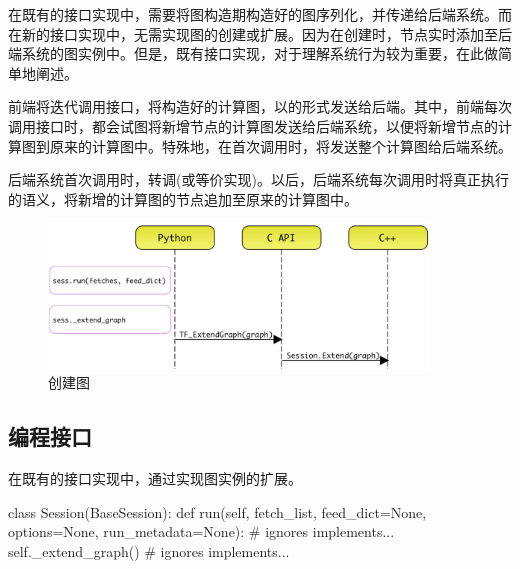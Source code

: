 \begin{content}

在既有的接口实现中，需要将图构造期构造好的图序列化，并传递给后端系统。而在新的接口实现中，无需实现图的创建或扩展。因为在创建时，节点实时添加至后端系统的图实例中。但是，既有接口实现，对于理解系统行为较为重要，在此做简单地阐述。

前端将迭代调用接口，将构造好的计算图，以的形式发送给\cpp{}后端。其中，前端每次调用接口时，都会试图将新增节点的计算图发送给后端系统，以便将新增节点的计算图到原来的计算图中。特殊地，在首次调用时，将发送整个计算图给后端系统。

后端系统首次调用时，转调(或等价实现)。以后，后端系统每次调用时将真正执行的语义，将新增的计算图的节点追加至原来的计算图中。

\begin{figure}[H]
\centering
\includegraphics[width=0.9\textwidth]{figures/py-session-create-graph.png}
\caption{创建图}
 \label{fig:py-session-create-graph}
\end{figure}

\subsection{编程接口}

在既有的接口实现中，通过实现图实例的扩展。

\begin{leftbar}
\begin{python}[caption={tensorflow/python/client/session.py}]
class Session(BaseSession):
  def run(self, fetch_list, feed_dict=None, options=None, run_metadata=None):
    # ignores implements...
    self._extend_graph()
    # ignores implements...

\end{python}
\end{leftbar}


\end{content}

